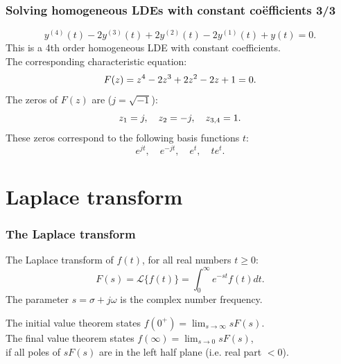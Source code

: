 \begin{frame}
\frametitle{Solving homogeneous LDEs with constant coëfficients 3/3}
\begin{example}
	\begin{equation*}
	y^{(4)}(t) - 2 y^{(3)}(t) + 2 y^{(2)}(t) - 2 y^{(1)}(t) + y(t) = 0.
	\end{equation*}
	This is a 4th order homogeneous LDE with constant coefficients.\\
	The corresponding characteristic equation:
	\vspace{-0.5em}
	\begin{equation*}
	F(z) = z^4 - 2z^3 + 2z^2 - 2 z + 1 = 0.
	\vspace{-0.5em}
	\end{equation*}
	The zeros of $F(z)$ are ($j=\sqrt{-1}$):
	\vspace{-0.5em}
	\begin{equation*}
	z_1 = j, \quad z_2 = -j, \quad z_{3, 4} = 1.
	\vspace{-0.5em}
	\end{equation*}
	These zeros correspond to the following basis functions $t$:
	\vspace{-0.5em}
	\begin{equation*}
	 e^{jt}, \quad e^{-jt}, \quad e^t, \quad te^t.
	\end{equation*}
\end{example}
\end{frame}

\section{Laplace transform}

\begin{frame}
\frametitle{The Laplace transform}

\begin{definition}
The Laplace transform of $f(t)$, for all real numbers $t\geq 0$:
\begin{equation*}
F(s) = \mathcal{L}\big\{f(t)\big\} = \int_0^\infty e^{-st} f(t) dt.
\end{equation*}
The parameter $s = \sigma + j\omega$ is the complex number frequency.\\
\end{definition}

\vspace{1em}
The initial value theorem states $f(0^+) = \lim_{s\rightarrow\infty} sF(s)$. \\
The final value theorem states $f(\infty) = \lim_{s\rightarrow0} sF(s)$, \\
if all poles of $sF(s)$ are in the left half plane (i.e. real part $<0$).
\end{frame}

